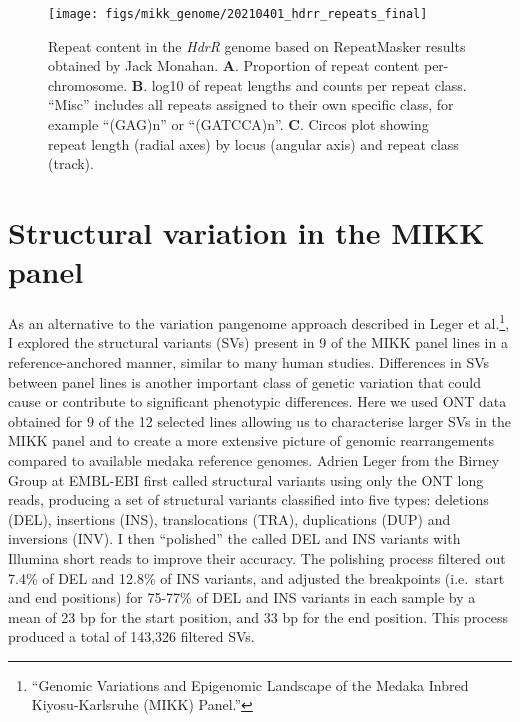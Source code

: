 \documentclass[
]{book}
\begin{document}
\begin{figure}
\texttt{[image: figs/mikk\_genome/20210401\_hdrr\_repeats\_final]} \caption{Repeat content in the \emph{HdrR} genome based on RepeatMasker results obtained by Jack Monahan. \textbf{A}. Proportion of repeat content per-chromosome. \textbf{B}. log10 of repeat lengths and counts per repeat class. ``Misc'' includes all repeats assigned to their own specific class, for example ``(GAG)n'' or ``(GATCCA)n''. \textbf{C}. Circos plot showing repeat length (radial axes) by locus (angular axis) and repeat class (track).}\label{fig:repeats}
\end{figure}

\hypertarget{mikksv-sec}{%
\section{Structural variation in the MIKK panel}\label{mikksv-sec}}

As an alternative to the variation pangenome approach described in Leger et al.\footnote{{``Genomic Variations and Epigenomic Landscape of the {Medaka Inbred Kiyosu-Karlsruhe} ({MIKK}) Panel.''}}, I explored the structural variants (SVs) present in 9 of the MIKK panel lines in a reference-anchored manner, similar to many human studies. Differences in SVs between panel lines is another important class of genetic variation that could cause or contribute to significant phenotypic differences. Here we used ONT data obtained for 9 of the 12 selected lines allowing us to characterise larger SVs in the MIKK panel and to create a more extensive picture of genomic rearrangements compared to available medaka reference genomes. Adrien Leger from the Birney Group at EMBL-EBI first called structural variants using only the ONT long reads, producing a set of structural variants classified into five types: deletions (DEL), insertions (INS), translocations (TRA), duplications (DUP) and inversions (INV). I then ``polished'' the called DEL and INS variants with Illumina short reads to improve their accuracy. The polishing process filtered out 7.4\% of DEL and 12.8\% of INS variants, and adjusted the breakpoints (i.e.~start and end positions) for 75-77\% of DEL and INS variants in each sample by a mean of 23 bp for the start position, and 33 bp for the end position. This process produced a total of 143,326 filtered SVs.
\end{document}
